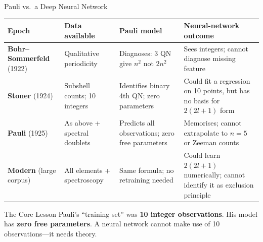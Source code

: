 \documentclass[aspectratio=169,12pt]{beamer}
\begin{document}
\begin{frame}[shrink=40]{Pauli vs.\ a Deep Neural Network}

\begin{center}
\small
\renewcommand{\arraystretch}{1.2}
\begin{tabular}{p{3.0cm}p{2.5cm}p{3.5cm}p{4.5cm}}
\toprule
Epoch & Data available & Pauli model & Neural-network outcome \\
\midrule
\textbf{Bohr--Sommerfeld} (1922) &
  Qualitative periodicity &
  Diagnoses: 3 QN give $n^2$ not $2n^2$ &
  Sees integers; cannot diagnose missing feature \\[3pt]
\textbf{Stoner} (1924) &
  Subshell counts; 10 integers &
  Identifies binary 4th QN; zero parameters &
  Could fit a regression on 10 points, but has no basis for $2(2l+1)$ form \\[3pt]
\textbf{Pauli} (1925) &
  As above + spectral doublets &
  Predicts all observations; zero free parameters &
  Memorises; cannot extrapolate to $n=5$ or Zeeman counts \\[3pt]
\textbf{Modern} (large corpus) &
  All elements + spectroscopy &
  Same formula; no retraining needed &
  Could learn $2(2l+1)$ numerically; cannot identify it as exclusion principle \\
\bottomrule
\end{tabular}
\end{center}

\bigskip
\begin{alertblock}{The Core Lesson}
Pauli's ``training set'' was \textbf{10 integer observations}.
His model has \textbf{zero free parameters}.
A neural network cannot make use of 10 observations---it needs theory.
\end{alertblock}

\end{frame}
\end{document}

